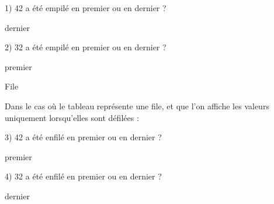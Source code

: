 \documentclass[11pt,a4paper]{article}
\begin{document}
\begin{center}
\begin{table}[ht!]
\begin{minipage}{0.45\textwidth}
\smallskip

\raggedright
1) 42 a été empilé en premier ou en dernier ?

\bigskip
dernier
\bigskip

2) 32 a été empilé en premier ou en dernier ?

\bigskip
premier
\bigskip

  \end{minipage}
  \hfillx
  \begin{minipage}{0.01\textwidth}


  \end{minipage}
  \hfillx
  \begin{minipage}{0.45\textwidth}
    \centering
File

Dans le cas où le tableau représente une file, et que l'on affiche les valeurs uniquement lorsqu'elles sont défilées :

\smallskip

\raggedright
3) 42 a été enfilé en premier ou en dernier ?

\bigskip
premier
\bigskip

4) 32 a été enfilé en premier ou en dernier ?

\bigskip
dernier
\bigskip

  \end{minipage}
\end{table}

\end{center}

\vspace*{-1.5cm}
\end{document}
